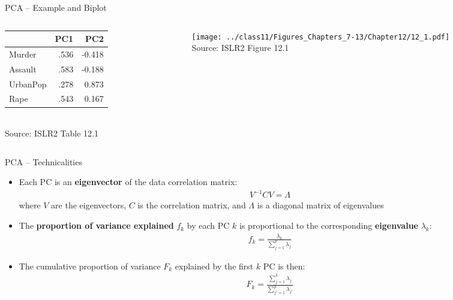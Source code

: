 \documentclass[ignorenonframetext,xcolor=x11names]{beamer}
\begin{document}
\begin{frame}{PCA -- Example and Biplot}
\begin{columns}
\begin{column}{0.3\textwidth}
\footnotesize
\begin{tabular}{l|r|r} \hline
          &  PC1 & PC2 \\ \hline
Murder    & .536  & -0.418 \\
Assault   & .583  & -0.188 \\
UrbanPop  & .278  & 0.873 \\ 
Rape      & .543 & 0.167 \\ \hline
\end{tabular} \\

\scriptsize Source: ISLR2 Table 12.1
\end{column}
\begin{column}{0.7\textwidth}
\texttt{[image: ../class11/Figures\_Chapters\_7-13/Chapter12/12\_1.pdf]} \\

\scriptsize Source: ISLR2 Figure 12.1
\end{column}
\end{columns}
\end{frame}

\begin{frame}{PCA -- Technicalities}
\begin{itemize}
  \item Each PC is an \textbf{eigenvector} of the data correlation matrix:
\begin{align*}
V^{-1}CV = \Lambda
\end{align*}
 where $V$ are the eigenvectors, $C$ is the correlation matrix, and $\Lambda$ is a diagonal matrix of eigenvalues
\end{itemize}
\begin{itemize}
  \item The \textbf{proportion of variance explained} $f_k$ by each PC $k$ is proportional to the corresponding \textbf{eigenvalue} $\lambda_k$:
\begin{align*}
f_k = \frac{\lambda_k}{\sum_{j=1}^p \lambda_{j}} 
\end{align*}
  \item The cumulative proportion of variance $F_k$ explained by the first $k$ PC is then:
\begin{align*}
F_k = \frac{\sum_{j=1}^k \lambda_j}{\sum_{j'=1}^p \lambda_{j'}}
\end{align*}
\end{itemize}
\end{frame}
\end{document}
